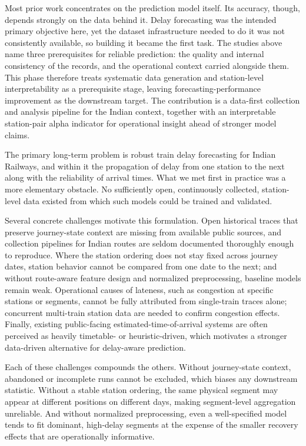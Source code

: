 \documentclass[a4paper,fleqn]{cas-dc}
\begin{document}
Most prior work concentrates on the prediction model itself. Its accuracy,
though, depends strongly on the data behind it. Delay forecasting was the
intended primary objective here, yet the dataset infrastructure needed to do
it was not consistently available, so building it became the first task. The
studies above name three prerequisites for reliable prediction: the quality
and internal consistency of the records, and the operational context carried
alongside them. This phase therefore treats systematic data generation and
station-level interpretability as a prerequisite stage, leaving
forecasting-performance improvement as the downstream target. The contribution
is a data-first collection and analysis pipeline for the Indian context,
together with an interpretable station-pair alpha indicator for operational
insight ahead of stronger model claims.

The primary long-term problem is robust train delay forecasting for Indian
Railways, and within it the propagation of delay from one station to the next
along with the reliability of arrival times. What we met first in practice was
a more elementary obstacle. No sufficiently open, continuously collected,
station-level data existed from which such models could be trained and
validated.

Several concrete challenges motivate this formulation. Open historical traces
that preserve journey-state context are missing from available public
sources, and collection pipelines for Indian routes are seldom documented
thoroughly enough to reproduce. Where the station ordering does not stay
fixed across journey dates, station behavior cannot be compared from one date
to the next; and without route-aware feature design and normalized
preprocessing, baseline models remain weak. Operational
causes of lateness, such as congestion at specific stations or segments,
cannot be fully attributed from single-train traces alone; concurrent
multi-train station data are needed to confirm congestion effects. Finally,
existing public-facing estimated-time-of-arrival systems are often perceived
as heavily timetable- or heuristic-driven, which motivates a stronger
data-driven alternative for delay-aware prediction.

Each of these challenges compounds the others. Without journey-state context,
abandoned or incomplete runs cannot be excluded, which biases any downstream
statistic. Without a stable station ordering, the same physical segment may
appear at different positions on different days, making segment-level
aggregation unreliable. And without normalized preprocessing, even a
well-specified model tends to fit dominant, high-delay segments at the expense
of the smaller recovery effects that are operationally informative.
\end{document}
